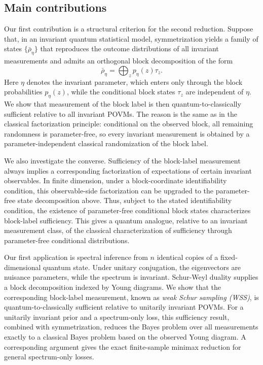 \documentclass{article}
\theoremstyle{named}
\theoremstyle{named1}
\theoremstyle{plain}
\theoremstyle{remark}
\begin{document}
\subsection{Main contributions}

Our first contribution is a structural criterion for the second reduction.
Suppose that, in an invariant quantum statistical model, symmetrization
yields a family of states $\{\bar\rho_\eta\}$ that reproduces the outcome
distributions of all invariant measurements and admits an orthogonal block
decomposition of the form
\[
    \bar\rho_\eta
    =
    \bigoplus_z p_\eta(z)\tau_z.
\]
Here $\eta$ denotes the invariant parameter, which enters only through the
block probabilities $p_\eta(z)$, while the conditional block states
$\tau_z$ are independent of $\eta$.
 We show that measurement of the block label is then
quantum-to-classically sufficient relative to all invariant POVMs. The
reason is the same as in the classical factorization principle: conditional
on the observed block, all remaining randomness is parameter-free, so every
invariant measurement is obtained by a parameter-independent classical
randomization of the block label.

We also investigate the converse. Sufficiency of the block-label measurement
always implies a corresponding factorization of expectations of certain invariant observables. In finite dimension, under a block-coordinate identifiability
condition, this observable-side factorization can be upgraded to the
parameter-free state decomposition above. Thus, subject to the stated
identifiability condition, the existence of parameter-free conditional block
states characterizes block-label sufficiency. This gives a quantum analogue,
relative to an invariant measurement class, of the classical
characterization of sufficiency through parameter-free conditional
distributions.

Our first application is spectral inference from $n$ identical copies
of a fixed-dimensional quantum state. Under unitary conjugation, the
eigenvectors are nuisance parameters, while the spectrum is invariant.
Schur-Weyl duality supplies a block decomposition indexed by Young
diagrams. We show that the corresponding block-label measurement,
known as \emph{weak Schur sampling (WSS)}, is
quantum-to-classically sufficient relative to unitarily invariant
POVMs. For a unitarily invariant prior and a spectrum-only loss, this
sufficiency result, combined with symmetrization, reduces the Bayes
problem over all measurements exactly to a classical
Bayes problem based on the observed Young diagram. A corresponding
argument gives the exact finite-sample minimax reduction for general
spectrum-only losses.
\end{document}

